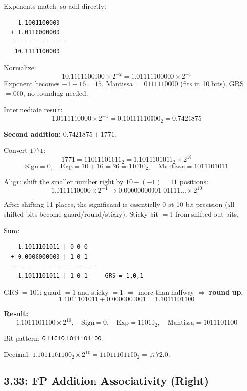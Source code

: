 Exponents match, so add directly:
\begin{verbatim}
    1.1001100000
  + 1.0110000000
  ----------------
   10.1111100000
\end{verbatim}

Normalize:
\[
  10.1111100000 \times 2^{-2}
  = 1.01111100000 \times 2^{-1}
\]
Exponent becomes $-1 + 16 = 15$. Mantissa $= 0111110000$ (fits in 10 bits).
GRS $= 000$, no rounding needed.

Intermediate result:
\[
  1.0111110000 \times 2^{-1} = 0.10111110000_2 = 0.7421875
\]

\noindent\textbf{Second addition:} $0.7421875 + 1771$.

Convert $1771$:
\[
  1771 = 11011101011_2 = 1.1011101011_2 \times 2^{10}
\]
\[
  \text{Sign} = 0,\quad
  \text{Exp} = 10 + 16 = 26 = 11010_2,\quad
  \text{Mantissa} = 1011101011
\]

Align: shift the smaller number right by $10 - (-1) = 11$ positions:
\[
  1.0111110000 \times 2^{-1} \to 0.00000000001\;01111\ldots \times 2^{10}
\]

After shifting 11 places, the significand is essentially 0 at 10-bit precision
(all shifted bits become guard/round/sticky). Sticky bit $= 1$ from shifted-out
bits.

Sum:
\begin{verbatim}
    1.1011101011 | 0 0 0
  + 0.0000000000 | 1 0 1
  ----------------------------
    1.1011101011 | 1 0 1     GRS = 1,0,1
\end{verbatim}
\vspace{-6pt}

GRS $= 101$: guard $= 1$ and sticky $= 1$
$\Rightarrow$ more than halfway $\Rightarrow$ \textbf{round up}.
\[
  1.1011101011 + 0.0000000001 = 1.1011101100
\]

\noindent\textbf{Result:}
\[
  1.1011101100 \times 2^{10},\quad
  \text{Sign} = 0,\quad
  \text{Exp} = 11010_2,\quad
  \text{Mantissa} = 1011101100
\]

Bit pattern: $\texttt{0\,11010\,1011101100}$.

Decimal: $1.1011101100_2 \times 2^{10} = 11011101100_2 = \mathbf{1772.0}$.

\subsection*{3.33: FP Addition Associativity (Right)}
\hypertarget{sol-3.33}{}

